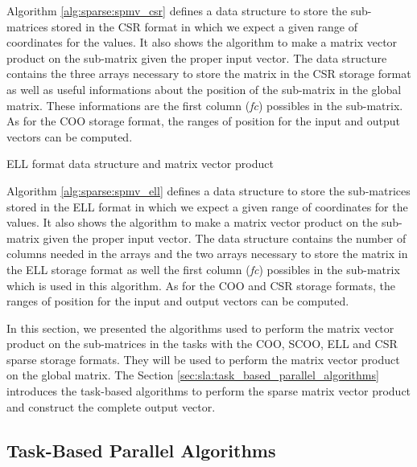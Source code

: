 Algorithm \ref{alg:sparse:spmv_csr} defines a data structure to store the sub-matrices stored in the CSR format in which we expect a given range of coordinates for the values.
It also shows the algorithm to make a matrix vector product on the sub-matrix given the proper input vector.
The data structure contains the three arrays necessary to store the matrix in the CSR storage format as well as useful informations about the position of the sub-matrix in the global matrix.
These informations are the first column (\textit{fc}) possibles in the sub-matrix.
As for the COO storage format, the ranges of position for the input and output vectors can be computed.


\begin{algorithm}[h]
	\DontPrintSemicolon
	\SetAlgoVlined
	\caption{ELL format data structure and matrix vector product\label{alg:sparse:spmv_ell}}

	\;
\end{algorithm}

Algorithm \ref{alg:sparse:spmv_ell} defines a data structure to store the sub-matrices stored in the ELL format in which we expect a given range of coordinates for the values.
It also shows the algorithm to make a matrix vector product on the sub-matrix given the proper input vector.
The data structure contains the number of columns needed in the arrays and the two arrays necessary to store the matrix in the ELL storage format as well the first column (\textit{fc}) possibles in the sub-matrix which is used in this algorithm.
As for the COO and CSR storage formats, the ranges of position for the input and output vectors can be computed.

In this section, we presented the algorithms used to perform the matrix vector product on the sub-matrices in the tasks with the COO, SCOO, ELL and CSR sparse storage formats.
They will be used to perform the matrix vector product on the global matrix.
The Section \ref{sec:sla:task_based_parallel_algorithms} introduces the task-based algorithms to perform the sparse matrix vector product and construct the complete output vector.

\subsection{Task-Based Parallel Algorithms \label{sec:sla:task_based_parallel_algorithms}}

